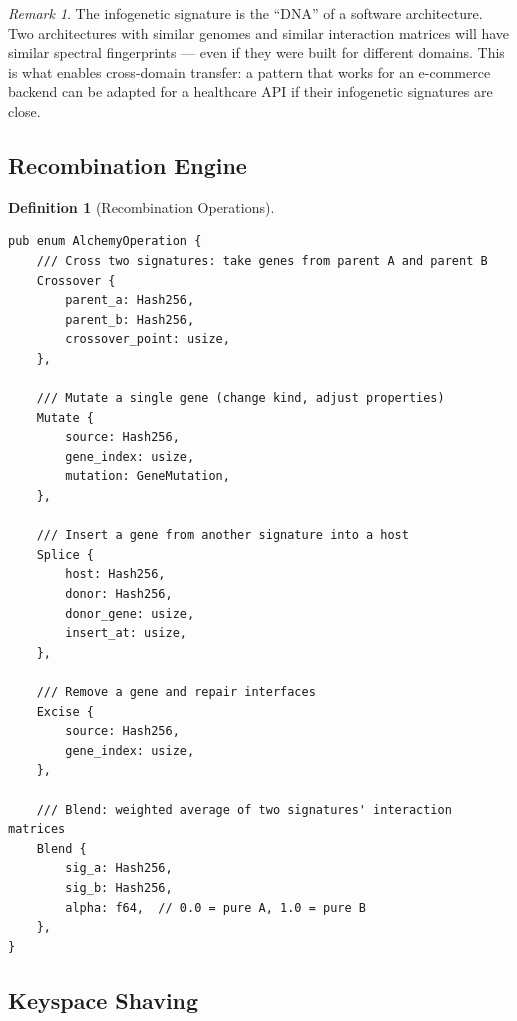 \documentclass[11pt,a4paper,twoside]{article}
\theoremstyle{definition}
\newtheorem{definition}{Definition}[section]
\theoremstyle{plain}
\theoremstyle{remark}
\newtheorem{remark}{Remark}[section]
\begin{document}
\begin{remark}
The infogenetic signature is the ``DNA'' of a software architecture.
Two architectures with similar genomes and similar interaction
matrices will have similar spectral fingerprints --- even if they were
built for different domains. This is what enables cross-domain
transfer: a pattern that works for an e-commerce backend can be
adapted for a healthcare API if their infogenetic signatures are
close.
\end{remark}

\subsection{Recombination Engine}\label{sec:al:recomb}

\begin{definition}[Recombination Operations]\label{def:recomb}
\begin{lstlisting}
pub enum AlchemyOperation {
    /// Cross two signatures: take genes from parent A and parent B
    Crossover {
        parent_a: Hash256,
        parent_b: Hash256,
        crossover_point: usize,
    },

    /// Mutate a single gene (change kind, adjust properties)
    Mutate {
        source: Hash256,
        gene_index: usize,
        mutation: GeneMutation,
    },

    /// Insert a gene from another signature into a host
    Splice {
        host: Hash256,
        donor: Hash256,
        donor_gene: usize,
        insert_at: usize,
    },

    /// Remove a gene and repair interfaces
    Excise {
        source: Hash256,
        gene_index: usize,
    },

    /// Blend: weighted average of two signatures' interaction matrices
    Blend {
        sig_a: Hash256,
        sig_b: Hash256,
        alpha: f64,  // 0.0 = pure A, 1.0 = pure B
    },
}
\end{lstlisting}
\end{definition}

\subsection{Keyspace Shaving}\label{sec:al:keyspace}
\end{document}
